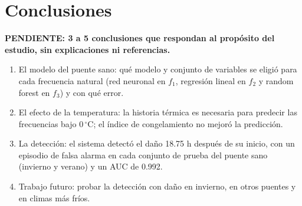 \documentclass[9pt,twocolumn,twoside]{opticajnl}
\begin{document}
\section{Conclusiones}
\textbf{PENDIENTE: 3 a 5 conclusiones que respondan al propósito del estudio, sin explicaciones ni referencias.}
\begin{enumerate}
\item El modelo del puente sano: qué modelo y conjunto de variables se eligió para cada frecuencia natural (red neuronal en $f_1$, regresión lineal en $f_2$ y random forest en $f_3$) y con qué error.
\item El efecto de la temperatura: la historia térmica es necesaria para predecir las frecuencias bajo $0\,^\circ$C; el índice de congelamiento no mejoró la predicción.
\item La detección: el sistema detectó el daño 18.75 h después de su inicio, con un episodio de falsa alarma en cada conjunto de prueba del puente sano (invierno y verano) y un AUC de 0.992.
\item Trabajo futuro: probar la detección con daño en invierno, en otros puentes y en climas más fríos.
\end{enumerate}

\begin{backmatter}
\end{backmatter}



\end{document}
